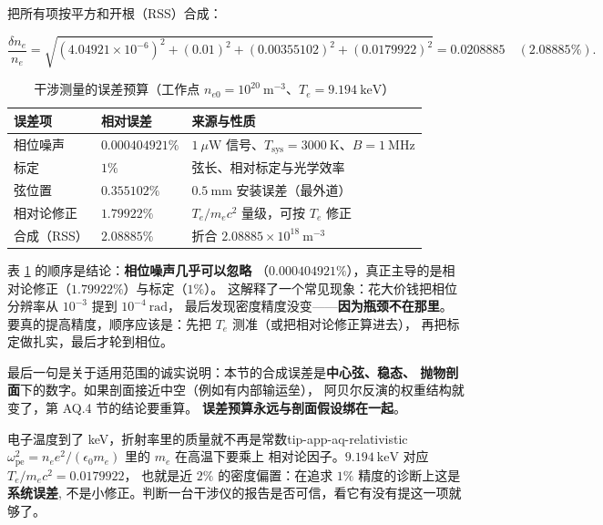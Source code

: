 把所有项按平方和开根（RSS）合成：

\begin{equation}
\frac{\delta n_e}{n_e} = \sqrt{\left(4.04921\times10^{-6}\right)^2 + (0.01)^2
+ (0.00355102)^2 + (0.0179922)^2} = 0.0208885 \quad (2.08885\%).
\label{eq:app-aq-budget}
\end{equation}

\begin{table}[htbp]
\centering
\small
\caption{干涉测量的误差预算（工作点 $n_{e0} = 10^{20}\ \mathrm{m^{-3}}$、$T_e = 9.194\ \mathrm{keV}$）}
\label{tab:app-aq-error}
\setlength{\tabcolsep}{4pt}
\begin{tabular}{p{4.2cm}p{3.2cm}p{6.2cm}}
\toprule
误差项 & 相对误差 & 来源与性质 \\
\midrule
相位噪声 & $0.000404921\%$ & $1\ \mu\mathrm{W}$ 信号、$T_{\mathrm{sys}} = 3000\ \mathrm{K}$、$B = 1\ \mathrm{MHz}$ \\
标定 & $1\%$ & 弦长、相对标定与光学效率 \\
弦位置 & $0.355102\%$ & $0.5\ \mathrm{mm}$ 安装误差（最外道） \\
相对论修正 & $1.79922\%$ & $T_e/m_ec^2$ 量级，可按 $T_e$ 修正 \\
\midrule
合成（RSS） & $2.08885\%$ & 折合 $2.08885\times10^{18}\ \mathrm{m^{-3}}$ \\
\bottomrule
\end{tabular}
\end{table}

表 \ref{tab:app-aq-error} 的顺序是结论：\textbf{相位噪声几乎可以忽略}
（$0.000404921\%$），真正主导的是相对论修正（$1.79922\%$）与标定（$1\%$）。
这解释了一个常见现象：花大价钱把相位分辨率从 $10^{-3}$ 提到 $10^{-4}\ \mathrm{rad}$，
最后发现密度精度没变——\textbf{因为瓶颈不在那里}。
要真的提高精度，顺序应该是：先把 $T_e$ 测准（或把相对论修正算进去），
再把标定做扎实，最后才轮到相位。

最后一句是关于适用范围的诚实说明：本节的合成误差是\textbf{中心弦、稳态、
抛物剖面}下的数字。如果剖面接近中空（例如有内部输运垒），
阿贝尔反演的权重结构就变了，第 AQ.4 节的结论要重算。
\textbf{误差预算永远与剖面假设绑在一起}。

\begin{tip}{电子温度到了 keV，折射率里的质量就不再是常数}{tip-app-aq-relativistic}
$\omega_{\mathrm{pe}}^2 = n_ee^2/(\epsilon_0m_e)$ 里的 $m_e$ 在高温下要乘上
相对论因子。$9.194\ \mathrm{keV}$ 对应 $T_e/m_ec^2 = 0.0179922$，
也就是近 $2\%$ 的密度偏置：在追求 $1\%$ 精度的诊断上这是\textbf{系统误差},
不是小修正。判断一台干涉仪的报告是否可信，看它有没有提这一项就够了。
\end{tip}


